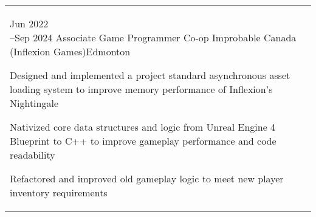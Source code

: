 \documentclass[a4paper]{modernsimplecv}
\begin{document}

\subsection*{}
\vspace{-4em}

\setlength{\columnsep}{0.03\textwidth}
\small
\begin{paracol}{2}
   

	\begin{minipage}[t]{\rightcolwidth}
		
        \vspace{1em}
        \section*{}
        
        \begin{tabular}{@{\raggedright}p{} |>{\raggedright\arraybackslash}p{}}
            \cvevent{Jun 2022\newline --Sep 2024}
                {Associate Game Programmer Co-op}
                {Improbable Canada (Inflexion Games)}{Edmonton}
                {\begin{tabitemize}
                    \item Designed and implemented a project standard asynchronous asset loading system to improve memory performance of Inflexion's Nightingale
                    \item Nativized core data structures and logic from Unreal Engine 4 Blueprint to C++ to improve gameplay performance and code readability
                    \item Refactored and improved old gameplay logic to meet new player inventory requirements
                \end{tabitemize}   
                }\\


\end{tabular}
\end{minipage}
\end{paracol}
\end{document}
